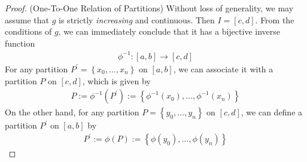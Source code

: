 \documentclass[thmcnt=section, 12pt]{my-elegantbook}
\begin{document}
\begin{proof}
    (One-To-One Relation of Partitions) Without loss of generality, we may assume that $g$ is strictly \textit{increasing} and continuous. Then $I = [c, d]$. From the conditions of $g$, we can immediately conclude that it has a bijective inverse function
    \begin{align*}
        \phi^{-1}: [a, b] \to [c, d]
    \end{align*}
    For any partition $P^\prime = \left\{x_0, \ldots, x_n\right\}$ on $[a, b]$, we can associate it with a partition $P$ on $[c, d]$, which is given by 
    \begin{align*}
        P := \phi^{-1}(P^\prime) 
        := \left\{\phi^{-1}(x_0), \ldots, \phi^{-1}(x_n)\right\}
    \end{align*}
    On the other hand, for any partition $P = \left\{y_0, \ldots, y_n\right\}$ on $[c, d]$, we can define a partition $P^\prime$ on $[a, b]$ by 
    \begin{align*}
        P^\prime := \phi(P) := \left\{\phi(y_0), \ldots, \phi(y_n)\right\}
    \end{align*}


\end{proof}
\end{document}
